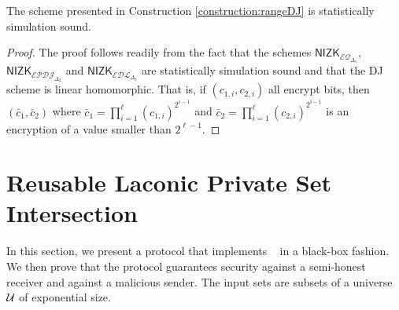 \begin{lemma}
\label{lemma:soundrangeDJ}
The scheme presented in Construction \ref{construction:rangeDJ} is statistically simulation sound.
\end{lemma}
\begin{proof}
The proof follows readily from the fact that the schemes $\mathsf{NIZK}_{\mathcal{EQ}_{\Delta_1}}$, $\mathsf{NIZK}_{\mathcal{EPDJ}_{\Delta_2}}$ and $\mathsf{NIZK}_{\mathcal{EDL}_{\Delta_3}}$ are statistically simulation sound and that the DJ scheme is linear homomorphic. That is, if $(c_{1,i},c_{2,i})$ all encrypt bits, then $(\bar c_1,\bar c_2)$ where $\bar c_1=\prod_{i=1}^\ell (c_{1,i})^{2^{i-1}}$ and  $\bar c_2=\prod_{i=1}^\ell (c_{2,i})^{2^{i-1}}$ is an encryption of a value smaller than $2^{\ell-1}$.
\end{proof}

\section{Reusable Laconic Private Set Intersection}
\label{sec:lpsi}

In this section, we present a  protocol that implements \ePSI~ in a black-box fashion. We then prove that the protocol guarantees security against a semi-honest receiver and against a malicious sender. The input sets are subsets of a universe $\mathcal{U}$ of exponential size.

